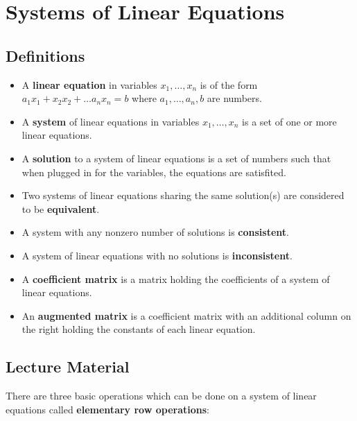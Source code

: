 \documentclass{article}
\begin{document}
\section{Systems of Linear Equations}


\subsection{Definitions}

\begin{itemize}

\item
A \textbf{linear equation} in variables $ x_1, \dots, x_n $ is of the form
$ a_1 x_1 + x_2 x_2 + \dots a_n x_n = b $ where $ a_1, \dots, a_n, b $ are
numbers.

\item
A \textbf{system} of linear equations in variables $ x_1, \dots, x_n $ is a
set of one or more linear equations.

\item
A \textbf{solution} to a system of linear equations is a set of numbers such
that when plugged in for the variables, the equations are satisfited.

\item
Two systems of linear equations sharing the same solution(s) are considered to
be \textbf{equivalent}.

\item
A system with any nonzero number of solutions is \textbf{consistent}.

\item
A system of linear equations with no solutions is \textbf{inconsistent}.

\item
A \textbf{coefficient matrix} is a matrix holding the coefficients of a system
of linear equations.

\item
An \textbf{augmented matrix} is a coefficient matrix with an additional column
on the right holding the constants of each linear equation.

\end{itemize}


\subsection{Lecture Material}

There are three basic operations which can be done on a system of linear
equations called \textbf{elementary row operations}:
\end{document}
